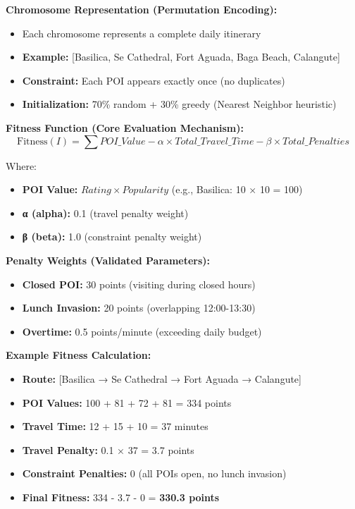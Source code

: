 \textbf{Chromosome Representation (Permutation Encoding):}
\begin{itemize}
\item Each chromosome represents a complete daily itinerary
\item \textbf{Example:} [Basilica, Se Cathedral, Fort Aguada, Baga Beach, Calangute]
\item \textbf{Constraint:} Each POI appears exactly once (no duplicates)
\item \textbf{Initialization:} 70\% random + 30\% greedy (Nearest Neighbor heuristic)
\end{itemize}

\textbf{Fitness Function (Core Evaluation Mechanism):}
\begin{equation}
\text{Fitness}(I) = \sum POI\_Value - \alpha \times Total\_Travel\_Time - \beta \times Total\_Penalties
\end{equation}

Where:
\begin{itemize}
\item \textbf{POI Value:} $Rating \times Popularity$ (e.g., Basilica: 10 × 10 = 100)
\item \textbf{α (alpha):} 0.1 (travel penalty weight)
\item \textbf{β (beta):} 1.0 (constraint penalty weight)
\end{itemize}

\textbf{Penalty Weights (Validated Parameters):}
\begin{itemize}
\item \textbf{Closed POI:} 30 points (visiting during closed hours)
\item \textbf{Lunch Invasion:} 20 points (overlapping 12:00-13:30)
\item \textbf{Overtime:} 0.5 points/minute (exceeding daily budget)
\end{itemize}

\textbf{Example Fitness Calculation:}
\begin{itemize}
\item \textbf{Route:} [Basilica → Se Cathedral → Fort Aguada → Calangute]
\item \textbf{POI Values:} 100 + 81 + 72 + 81 = 334 points
\item \textbf{Travel Time:} 12 + 15 + 10 = 37 minutes
\item \textbf{Travel Penalty:} 0.1 × 37 = 3.7 points
\item \textbf{Constraint Penalties:} 0 (all POIs open, no lunch invasion)
\item \textbf{Final Fitness:} 334 - 3.7 - 0 = \textbf{330.3 points}
\end{itemize}

